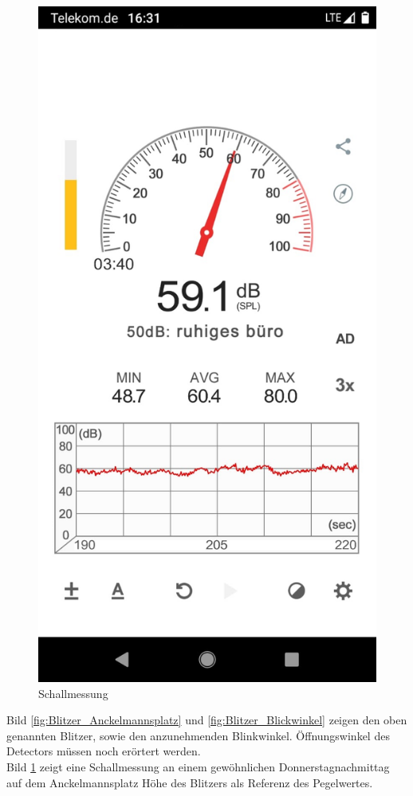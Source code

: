 \begin{figure}[h]
\centering
\includegraphics[scale=0.15]{Sections/Brainstorming/Pegelmessung_Anckelmannsplatz_am_Blitzer_Nachmittag.jpeg}
\caption{Schallmessung}
\label{fig:Schallmessung}
\end{figure}

Bild \ref{fig:Blitzer_Anckelmannsplatz} und \ref{fig:Blitzer_Blickwinkel} zeigen den oben genannten Blitzer, sowie den anzunehmenden Blinkwinkel. Öffnungswinkel des Detectors müssen noch erörtert werden. \\
\noindent Bild \ref{fig:Schallmessung} zeigt eine Schallmessung an einem gewöhnlichen Donnerstagnachmittag auf dem Anckelmannsplatz Höhe des Blitzers als Referenz des Pegelwertes.

\newpage



\newpage